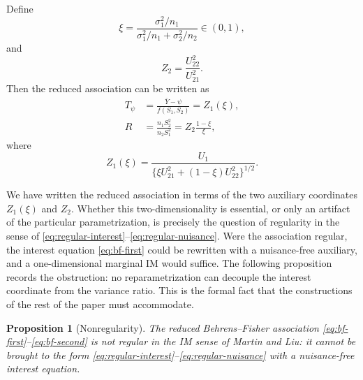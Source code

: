 \documentclass[12pt]{article}
\newtheorem{proposition}{Proposition}
\begin{document}
Define
\[
\xi
=
\frac{\sigma_1^2/n_1}
{\sigma_1^2/n_1+\sigma_2^2/n_2}
\in(0,1),
\]
and
\[
Z_2=\frac{U_{22}^2}{U_{21}^2}.
\]
Then the reduced association can be written as
\begin{align}
T_\psi
&=
\frac{\bar Y-\psi}{f(S_1,S_2)}
=
Z_1(\xi), \label{eq:bf-first}\\
R
&=
\frac{n_1S_2^2}{n_2S_1^2}
=
Z_2\frac{1-\xi}{\xi}, \label{eq:bf-second}
\end{align}
where
\[
Z_1(\xi)
=
\frac{U_1}
{\{\xi U_{21}^2+(1-\xi)U_{22}^2\}^{1/2}}.
\]

We have written the reduced association in terms of the two auxiliary
coordinates \(Z_1(\xi)\) and \(Z_2\).  Whether this two-dimensionality is
essential, or only an artifact of the particular parametrization, is precisely
the question of regularity in the sense of
\eqref{eq:regular-interest}--\eqref{eq:regular-nuisance}.  Were the association
regular, the interest equation \eqref{eq:bf-first} could be rewritten with a
nuisance-free auxiliary, and a one-dimensional marginal IM would suffice.  The
following proposition records the obstruction: no reparametrization can decouple
the interest coordinate from the variance ratio.  This is the formal fact that
the constructions of the rest of the paper must accommodate.

\begin{proposition}[Nonregularity]
\label{prop:nonregular}
The reduced Behrens--Fisher association \eqref{eq:bf-first}--\eqref{eq:bf-second}
is not regular in the IM sense of Martin and Liu: it cannot be brought to the
form \eqref{eq:regular-interest}--\eqref{eq:regular-nuisance} with a
nuisance-free interest equation.
\end{proposition}
\end{document}
